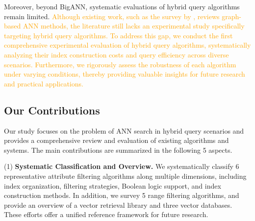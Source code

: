\documentclass[sigconf, nonacm]{acmart}
\begin{document}
	
	Moreover, beyond BigANN, systematic evaluations of hybrid query algorithms remain limited. \textcolor{orange}{Although existing work, such as the survey by \cite{compare}, reviews graph-based ANN methods, the literature still lacks an experimental study specifically targeting hybrid query algorithms. To address this gap, we conduct the first comprehensive experimental evaluation of hybrid query algorithms, systematically analyzing their index construction costs and query efficiency across diverse scenarios. Furthermore, we rigorously assess the robustness of each algorithm under varying conditions, thereby providing valuable insights for future research and practical applications.}
	
	\subsection{Our Contributions}
	
	Our study focuses on the problem of ANN search in hybrid query scenarios and provides a comprehensive review and evaluation of existing algorithms and systems. The main contributions are summarized in the following 5 aspects.
	
	(1)\textbf{ Systematic Classification and Overview.}
	We systematically classify 6 representative attribute filtering algorithms along multiple dimensions, including index organization, filtering strategies, Boolean logic support, and index construction methods. In addition, we survey 5 range filtering algorithms, and provide an overview of a vector retrieval library and three vector databases. These efforts offer a unified reference framework for future research.
	
\end{document}
